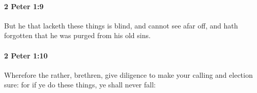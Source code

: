 		\paragraph{2 Peter 1:9} %
			\label{2PETER-1-9}

			But he that lacketh these things is blind, and cannot see afar off, and hath forgotten that he was purged from his old sins.

			\begin{framed}
			\scriptsize
				\begin{compactdesc}
					\item[SBLG] 
				\end{compactdesc}
			\end{framed}

		\paragraph{2 Peter 1:10} %
			\label{2PETER-1-10}

			Wherefore the rather, brethren, give diligence to make your calling and election sure: for if ye do these things, ye shall never fall:

